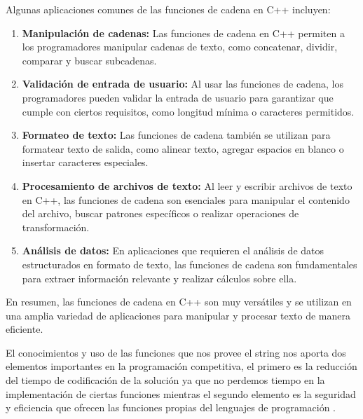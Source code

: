 Algunas aplicaciones comunes de las funciones de cadena en C++ incluyen:

\begin{enumerate}
	\item \textbf{Manipulación de cadenas:} Las funciones de cadena en C++ permiten a los programadores manipular cadenas de texto, como concatenar, dividir, comparar y buscar subcadenas.
	
	\item \textbf{Validación de entrada de usuario:} Al usar las funciones de cadena, los programadores pueden validar la entrada de usuario para garantizar que cumple con ciertos requisitos, como longitud mínima o caracteres permitidos.
	
	\item \textbf{Formateo de texto:} Las funciones de cadena también se utilizan para formatear texto de salida, como alinear texto, agregar espacios en blanco o insertar caracteres especiales.
	
	\item \textbf{Procesamiento de archivos de texto:} Al leer y escribir archivos de texto en C++, las funciones de cadena son esenciales para manipular el contenido del archivo, buscar patrones específicos o realizar operaciones de transformación.
	
	\item \textbf{Análisis de datos:} En aplicaciones que requieren el análisis de datos estructurados en formato de texto, las funciones de cadena son fundamentales para extraer información relevante y realizar cálculos sobre ella.
\end{enumerate}

En resumen, las funciones de cadena en C++ son muy versátiles y se utilizan en una amplia variedad de aplicaciones para manipular y procesar texto de manera eficiente.

El conocimientos y uso de las funciones que nos provee el string nos aporta dos elementos importantes en la programación competitiva, el primero es la reducción del tiempo de codificación de la solución ya que no perdemos tiempo en la implementación de ciertas funciones mientras el segundo elemento es la seguridad y eficiencia que ofrecen las funciones propias del lenguajes de programación .  